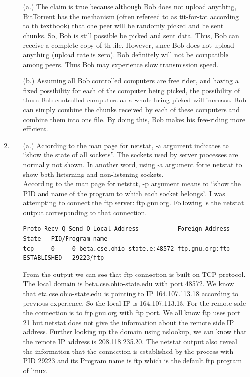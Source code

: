 \documentclass[12pt]{article}
\begin{document}
\begin{singlespace}
\begin{enumerate}
\begin{itemize}
	\item[(a.)] The claim is true because although Bob does not upload anything, BitTorrent has the mechanism (often refereed to as tit-for-tat according to th textbook) that one peer will be randomly picked and be sent chunks. So, Bob is still possible be picked and sent data. Thus, Bob can receive a complete copy of th file. However, since Bob does not upload anything (upload rate is zero), Bob definitely will not be compatible among peers. Thus Bob may experience slow transmission speed.
	\item[(b.)] Assuming all Bob controlled computers are free rider, and having a fixed possibility for each of the computer being picked, the possibility of these Bob controlled computers as a whole being picked will increase. Bob can simply combine the chunks received by each of these computers and combine them into one file. By doing this, Bob makes his free-riding more efficient.
	\end{itemize}
\item
	\begin{itemize}
	\item[(a.)] According to the man page for netstat, -a argument indicates to ``show the state of all sockets''. The sockets used by server processes are normally not shown. In another word, using -a argument force netstat to show both listerning and non-listening sockets.\\
	According to the man page for netstat, -p argument means to ``show the PID and name of the program to which each socket belongs''.
	I was attempting to connect the ftp server: ftp.gnu.org. Following is the netstat output corresponding to that connection.
	\begin{lstlisting}[basicstyle=\ttfamily\scriptsize]
Proto Recv-Q Send-Q Local Address           Foreign Address   State   PID/Program name             
tcp     0     0 beta.cse.ohio-state.e:48572 ftp.gnu.org:ftp ESTABLISHED   29223/ftp    
	\end{lstlisting}
	From the output we can see that ftp connection is built on TCP protocol. The local domain is beta.cse.ohio-state.edu with port 48572. We know that eta.cse.ohio-state.edu is pointing to IP 164.107.113.18 according to previous experience. So the local IP is 164.107.113.18. For the remote side the connection is to ftp.gnu.org with ftp port. We all know ftp uses port 21 but netstat does not give the information about the remote side IP address. Further looking up the domain using nslookup, we can know that the remote IP address is 208.118.235.20. The netstat output also reveal the information that the connection is established by the process with PID 29223 and its Program name is ftp which is the default ftp program of linux.


\end{itemize}
\end{enumerate}
\end{singlespace}
\end{document}
